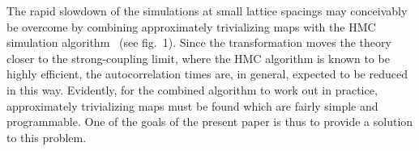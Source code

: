 The rapid slowdown of the simulations at small lattice spacings
may conceivably be overcome
by combining approximately trivializing maps
with the HMC simulation algorithm~\cite{HMC}
(see fig.~1).
Since the transformation moves the theory
closer to the strong-coupling limit, where
the HMC algorithm is known to be highly efficient,
the autocorrelation times are, in general, expected to be
reduced in this way. Evidently, for the combined algorithm
to work out in practice, approximately trivializing maps
must be found which are fairly simple and programmable.
One of the goals of the present paper is thus to provide a
solution to this problem.
